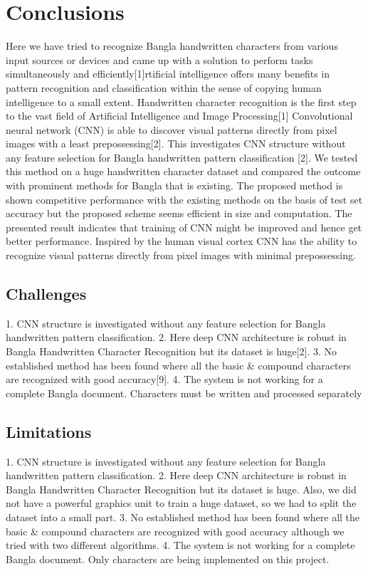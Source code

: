 \documentclass{article}
\begin{document}
\section{Conclusions}
Here we have tried to recognize Bangla handwritten characters from various input sources or devices and came up with a solution to perform tasks simultaneously and efficiently[1]rtificial intelligence offers many benefits in pattern recognition and classification within the sense of copying human intelligence to a small extent. Handwritten character recognition is the first step to the vast field of Artificial Intelligence and Image Processing[1]
Convolutional neural network (CNN) is able to discover visual patterns directly from pixel images with a least prepossessing[2]. This investigates CNN structure without any feature selection for Bangla handwritten pattern classification [2]. We tested this method on a huge handwritten character dataset and compared the outcome with prominent methods for Bangla that is existing. The proposed method is shown competitive performance with the existing methods on the basis of test set accuracy but the proposed scheme seems efficient in size and computation. The presented result indicates that training of CNN might be improved and hence get better performance. Inspired by the human visual cortex CNN has the ability to recognize visual patterns directly from pixel images with minimal prepossessing.

\subsection{Challenges}
1.	CNN structure is investigated without any feature selection for Bangla handwritten pattern classification. 
2.	Here deep CNN architecture is robust in Bangla Handwritten Character Recognition but its dataset is huge[2]. 
3.	No established method has been found where all the basic & compound characters are recognized with good accuracy[9].
4.	The system is not working for a complete Bangla document. Characters must be written and processed separately

\subsection{Limitations}

1.	CNN structure is investigated without any feature selection for Bangla handwritten pattern classification. 
2.	Here deep CNN architecture is robust in Bangla Handwritten Character Recognition but its dataset is huge. Also, we did not have a powerful graphics unit to train a huge dataset, so we had to split the dataset into a small part.
3.	No established method has been found where all the basic & compound characters are recognized with good accuracy although we tried with two different algorithms.
4.	The system is not working for a complete Bangla document. Only characters are being implemented on this project.
\end{document}

